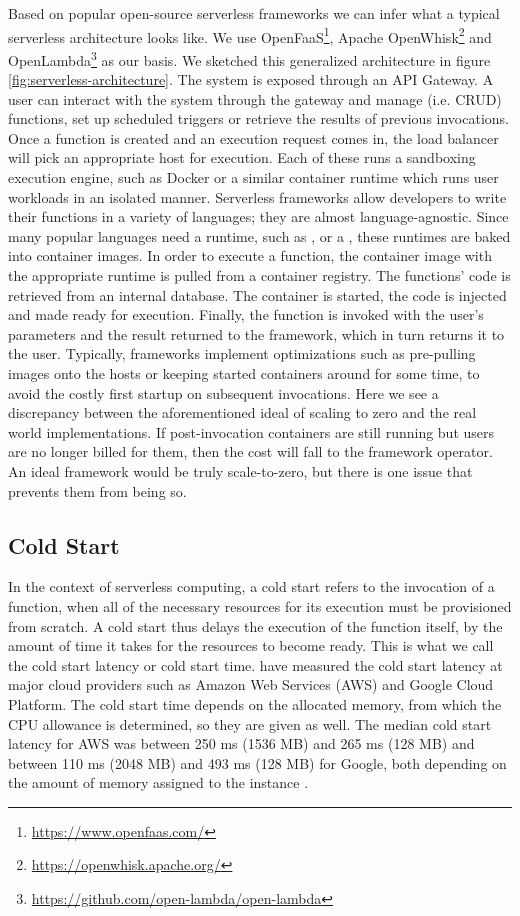 Based on popular open-source serverless frameworks we can infer what a typical serverless architecture looks like. We use OpenFaaS\footnote{\url{https://www.openfaas.com/}}, Apache OpenWhisk\footnote{\url{https://openwhisk.apache.org/}} and OpenLambda\footnote{\url{https://github.com/open-lambda/open-lambda}} as our basis. We sketched this generalized architecture in figure \ref{fig:serverless-architecture}. The system is exposed through an API Gateway. A user can interact with the system through the gateway and manage (i.e. CRUD) functions, set up scheduled triggers or retrieve the results of previous invocations. Once a function is created and an execution request comes in, the load balancer will pick an appropriate host for execution. Each of these runs a sandboxing execution engine, such as Docker or a similar container runtime which runs user workloads in an isolated manner.
Serverless frameworks allow developers to write their functions in a variety of languages; they are almost language-agnostic. Since many popular languages need a runtime, such as ,  or a , these runtimes are baked into container images. In order to execute a function, the container image with the appropriate runtime is pulled from a container registry.
The functions' code is retrieved from an internal database. The container is started, the code is injected and made ready for execution. Finally, the function is invoked with the user's parameters and the result returned to the framework, which in turn returns it to the user. Typically, frameworks implement optimizations such as pre-pulling images onto the hosts or keeping started containers around for some time, to avoid the costly first startup on subsequent invocations. Here we see a discrepancy between the aforementioned ideal of scaling to zero and the real world implementations. If post-invocation containers are still running but users are no longer billed for them, then the cost will fall to the framework operator. An ideal framework would be truly scale-to-zero, but there is one issue that prevents them from being so.

\subsection{Cold Start}

In the context of serverless computing, a cold start refers to the invocation of a function, when all of the necessary resources for its execution must be provisioned from scratch. A cold start thus delays the execution of the function itself, by the amount of time it takes for the resources to become ready. This is what we call the cold start latency or cold start time. \citeauthor{Wang2018} have measured the cold start latency at major cloud providers such as Amazon Web Services (AWS) and Google Cloud Platform. The cold start time depends on the allocated memory, from which the CPU allowance is determined, so they are given as well. The median cold start latency for AWS was between 250 ms (1536 MB) and 265 ms (128 MB) and between 110 ms (2048 MB) and 493 ms (128 MB) for Google, both depending on the amount of memory assigned to the instance \cite{Wang2018}.

